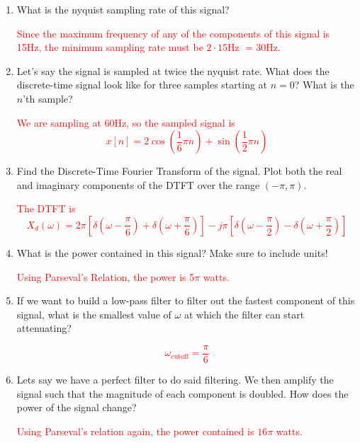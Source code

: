 \documentclass{article}
\begin{document}
\begin{enumerate}
    \item What is the nyquist sampling rate of this signal?
    
    \textcolor{red}{Since the maximum frequency of any of the components of this signal is 15Hz, the minimum sampling rate must be $2\cdot 15$Hz $= 30$Hz.}

    \item Let's say the signal is sampled at twice the nyquist rate. What does the discrete-time signal look like for three samples starting at $n=0$? What is the $n$'th sample?

    \textcolor{red}{We are sampling at $60$Hz, so the sampled signal is
    $$x[n] = 2\cos\left( \frac{1}{6}\pi n \right) + \sin\left( \frac{1}{2}\pi n \right)$$}
   
    \item Find the Discrete-Time Fourier Transform of the signal. Plot both the real and imaginary components of the DTFT over the range $(-\pi, \pi)$.

    \textcolor{red}{The DTFT is
    $$X_{d}(\omega) = 2\pi \left[ \delta\left(\omega - \frac{\pi}{6}\right) + \delta\left(\omega + \frac{\pi}{6}\right) \right] - j \pi \left[ \delta\left(\omega - \frac{\pi}{2}\right) - \delta\left(\omega + \frac{\pi}{2}\right) \right]$$}

    \item What is the power contained in this signal? Make sure to include units!

    \textcolor{red}{Using Parseval's Relation, the power is 5$\pi$ watts.}

    \item If we want to build a low-pass filter to filter out the fastest component of this signal, what is the smallest value of $\omega$ at which the filter can start attenuating? 

    \textcolor{red}{$$\omega_\text{cutoff} = \frac{\pi}{6}$$}

    \item Lets say we have a perfect filter to do said filtering. We then amplify the signal such that the magnitude of each component is doubled. How does the power of the signal change?

    \textcolor{red}{Using Parseval's relation again, the power contained is $16\pi$ watts.}
    
\end{enumerate}
\end{document}
